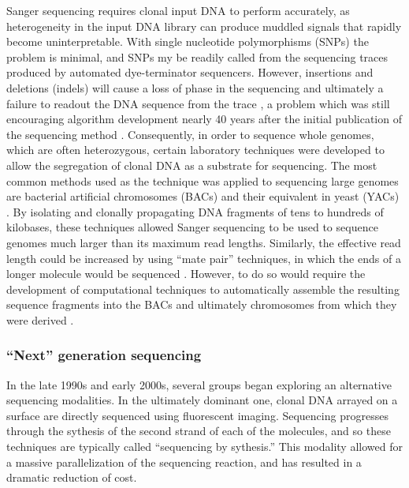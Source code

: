 Sanger sequencing requires clonal input DNA to perform accurately, as heterogeneity in the input DNA library can produce muddled signals that rapidly become uninterpretable.
With single nucleotide polymorphisms (SNPs) the problem is minimal, and SNPs my be readily called from the sequencing traces produced by automated dye-terminator sequencers.
However, insertions and deletions (indels) will cause a loss of phase in the sequencing and ultimately a failure to readout the DNA sequence from the trace \cite{tenney2007tale}, a problem which was still encouraging algorithm development nearly 40 years after the initial publication of the sequencing method \cite{hill2014poly}.
Consequently, in order to sequence whole genomes, which are often heterozygous, certain laboratory techniques were developed to allow the segregation of clonal DNA as a substrate for sequencing.
The most common methods used as the technique was applied to sequencing large genomes are bacterial artificial chromosomes (BACs) and their equivalent in yeast (YACs) \cite{monaco1994yacs}.
By isolating and clonally propagating DNA fragments of tens to hundreds of kilobases, these techniques allowed Sanger sequencing to be used to sequence genomes much larger than its maximum read lengths.
Similarly, the effective read length could be increased by using ``mate pair'' techniques, in which the ends of a longer molecule would be sequenced \cite{schmitt1996framework}.
However, to do so would require the development of computational techniques to automatically assemble the resulting sequence fragments into the BACs and ultimately chromosomes from which they were derived \cite{myers2000whole}.

\subsubsection{``Next'' generation sequencing}

In the late 1990s and early 2000s, several groups began exploring an alternative sequencing modalities.
In the ultimately dominant one, clonal DNA arrayed on a surface are directly sequenced using fluorescent imaging.
Sequencing progresses through the sythesis of the second strand of each of the molecules, and so these techniques are typically called ``sequencing by sythesis.''
This modality allowed for a massive parallelization of the sequencing reaction, and has resulted in a dramatic reduction of cost.

